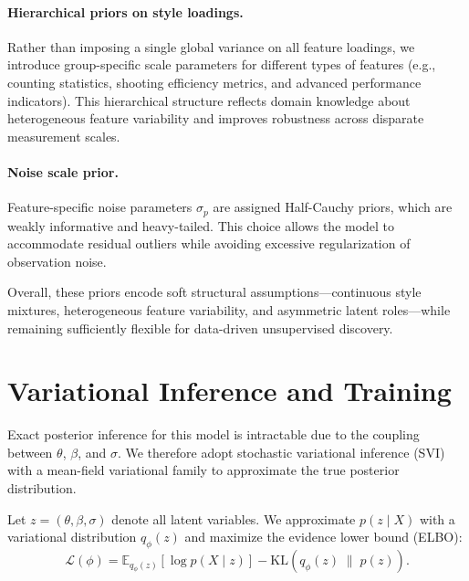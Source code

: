 \documentclass[12pt]{article}
\begin{document}
\paragraph{Hierarchical priors on style loadings.}
Rather than imposing a single global variance on all feature loadings, we introduce
group-specific scale parameters for different types of features (e.g., counting statistics,
shooting efficiency metrics, and advanced performance indicators).
This hierarchical structure reflects domain knowledge about heterogeneous feature variability
and improves robustness across disparate measurement scales.

\paragraph{Noise scale prior.}
Feature-specific noise parameters $\sigma_p$ are assigned Half-Cauchy priors, which are
weakly informative and heavy-tailed.
This choice allows the model to accommodate residual outliers while avoiding excessive
regularization of observation noise.

Overall, these priors encode soft structural assumptions---continuous style mixtures,
heterogeneous feature variability, and asymmetric latent roles---while remaining
sufficiently flexible for data-driven unsupervised discovery.

\section{Variational Inference and Training}

Exact posterior inference for this model is intractable due to the coupling between
$\theta$, $\beta$, and $\sigma$.
We therefore adopt stochastic variational inference (SVI) with a mean-field variational
family to approximate the true posterior distribution.

Let $z = (\theta, \beta, \sigma)$ denote all latent variables.
We approximate $p(z \mid X)$ with a variational distribution $q_\phi(z)$ and maximize the
evidence lower bound (ELBO):
\begin{equation}
\mathcal{L}(\phi)
=
\mathbb{E}_{q_\phi(z)}\!\left[\log p(X \mid z)\right]
-
\mathrm{KL}\!\left(q_\phi(z)\;\|\;p(z)\right).
\end{equation}
\end{document}
